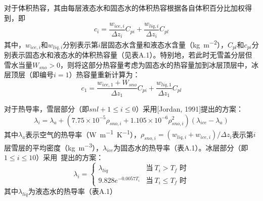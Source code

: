 对于体积热容，其由每层液态水和固态水的体积热容根据各自体积百分比加权得到，即
\begin{equation}
    c_i = \frac{w_{ice,i}}{\Delta z_i}C_{pi} + \frac{w_{liq,i}}{\Delta z_i}C_{pl}
\end{equation}
其中，$w_{ice,i}$和$w_{liq,i}$分别表示第$i$层固态水含量和液态水含量（\unit{kg.m^{-2}}），$C_{pl}$和$c_{pi}$分别表示固态水和液态水的体积热容量（见表A.1）。特别地，若此时无雪盖分层但雪水当量$W_{sno}>0$，则将这部分热容量考虑为固态水的热容量加到冰层顶层中，冰层顶层（即编号$i=1$）热容量重新计算为：
\begin{equation}
    c_1 = \frac{w_{ice,1}+W_{sno}}{\Delta z_1}C_{pi} + \frac{w_{liq,1}}{\Delta z_1}C_{pl}
\end{equation}

对于热导率，雪层部分（即$snl+1\leqslant i\leqslant 0$）采用[Jordan, 1991]提出的方案：
\begin{equation}
    \lambda_i = \lambda_a + \left(7.75 \times 10^{-5} \rho_{sno,i} + 1.105\times 10^{-6} \rho^2_{sno,i}\right)\left(\lambda_{ice}-\lambda_a\right)
\end{equation}
其中$\lambda_a$表示空气的热导率（\unit{W.m^{-1}.K^{-1}}），$\rho_{sno,i}=\left(w_{liq,i}+w_{ice,i}\right)/\Delta z_i$表示第$i$层雪层的平均密度（\unit{kg.m^{-3}}），$\lambda_{ice}$为固态水的热导率（表A.1）。冰层部分（即$1\leqslant i \leqslant 10$）采用~\citet{yen1981review}提出的方案：
\begin{equation}
    \lambda_i =\begin{cases}
        \lambda_{liq} &\text{当}\ T_i > T_f \text{ 时} \\
        9.828 e^{-0.0057 T_i} &\text{当}\ T_i \leqslant T_f \text{ 时}
    \end{cases}
\end{equation}
其中$\lambda_{liq}$为液态水的热导率（表A.1）

